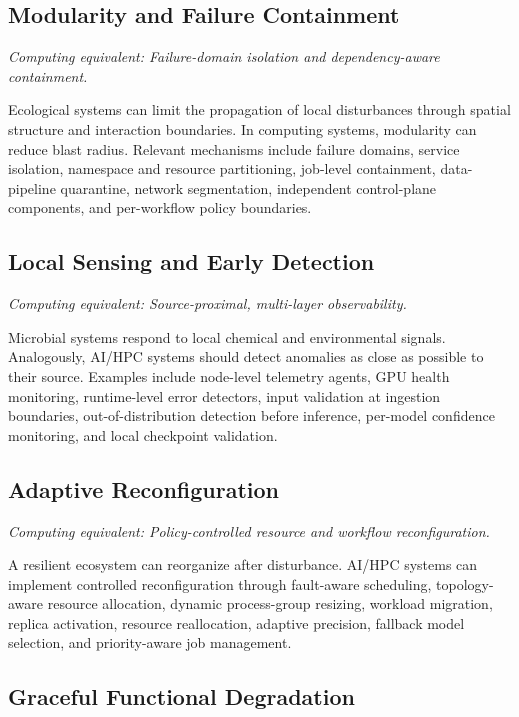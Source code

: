 \documentclass[conference]{IEEEtran}
\begin{document}
\subsection{Modularity and Failure Containment}

\emph{Computing equivalent: Failure-domain isolation and dependency-aware containment.}

Ecological systems can limit the propagation of local disturbances through spatial structure and interaction boundaries. In computing systems, modularity can reduce blast radius. Relevant mechanisms include failure domains, service isolation, namespace and resource partitioning, job-level containment, data-pipeline quarantine, network segmentation, independent control-plane components, and per-workflow policy boundaries.

\subsection{Local Sensing and Early Detection}

\emph{Computing equivalent: Source-proximal, multi-layer observability.}

Microbial systems respond to local chemical and environmental signals. Analogously, AI/HPC systems should detect anomalies as close as possible to their source. Examples include node-level telemetry agents, GPU health monitoring, runtime-level error detectors, input validation at ingestion boundaries, out-of-distribution detection before inference, per-model confidence monitoring, and local checkpoint validation.

\subsection{Adaptive Reconfiguration}

\emph{Computing equivalent: Policy-controlled resource and workflow reconfiguration.}

A resilient ecosystem can reorganize after disturbance. AI/HPC systems can implement controlled reconfiguration through fault-aware scheduling, topology-aware resource allocation, dynamic process-group resizing, workload migration, replica activation, resource reallocation, adaptive precision, fallback model selection, and priority-aware job management.

\subsection{Graceful Functional Degradation}
\end{document}
